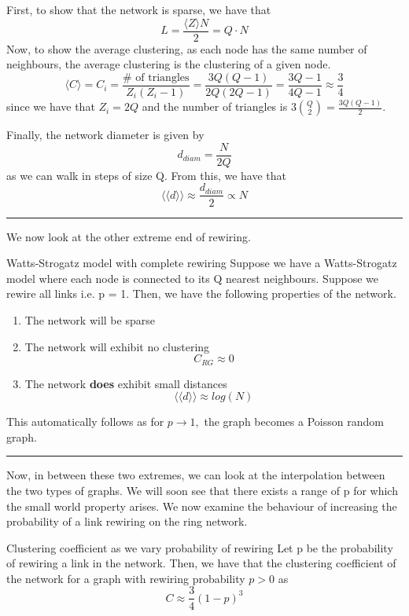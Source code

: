 \documentclass[twoside]{article}
\newenvironment{proof}{{\bf Proof:}}{\hfill\rule{2mm}{2mm}}
\begin{document}
\begin{proof} First, to show that the network is sparse, we have that 
$$
L = \frac{\langle Z \rangle N}{2} = Q \cdot N
$$
Now, to show the average clustering, as each node has the same number of neighbours, the average clustering is the clustering of a given node. 
$$
\langle C \rangle = C_i = \frac{\# \text{ of triangles}}{Z_i(Z_i - 1)} = \frac{3Q(Q - 1)}{2Q(2Q - 1)} = \frac{3Q - 1}{4Q - 1} \approx \frac{3}{4}
$$
since we have that $Z_i = 2Q$ and the number of triangles is $3 {Q \choose 2} = \frac{3Q(Q - 1)}{2}.$ 

Finally, the network diameter is given by 
$$
d_{diam} = \frac{N}{2Q}
$$
as we can walk in steps of size Q. From this, we have that 
$$
\langle \langle d \rangle \rangle \approx \frac{d_{diam}}{2} \propto N
$$
\end{proof}

We now look at the other extreme end of rewiring.

\begin{proposition_exam}{Watts-Strogatz model with complete rewiring}{} Suppose we have a Watts-Strogatz model where each node is connected to its Q nearest neighbours. Suppose we rewire all links i.e. p = 1. Then, we have the following properties of the network. 
\begin{enumerate}
\item The network will be sparse
\item The network will exhibit no clustering 
$$
C_{RG} \approx 0
$$
\item The network \textbf{does} exhibit small distances 
$$
\langle \langle d \rangle \rangle \approx log(N)
$$
\end{enumerate}
\end{proposition_exam}
\begin{proof} This automatically follows as for $p \rightarrow 1,$ the graph becomes a Poisson random graph.
\end{proof}

Now, in between these two extremes, we can look at the interpolation between the two types of graphs. We will soon see that there exists a range of p for which the small world property arises. We now examine the behaviour of increasing the probability of a link rewiring on the ring network.
\begin{proposition_exam}{Clustering coefficient as we vary probability of rewiring}{} Let p be the probability of rewiring a link in the network. Then, we have that the clustering coefficient of the network for a graph with rewiring probability $p > 0$ as 
$$
C \approx \frac{3}{4}(1 - p)^3
$$
\end{proposition_exam}
\end{document}
